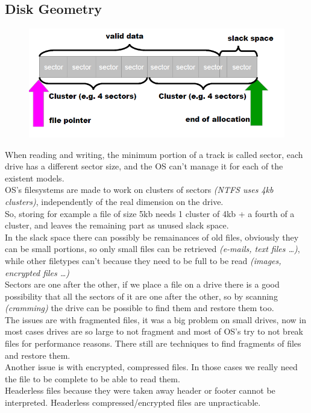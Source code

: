         \subsection{Disk Geometry}
            \begin{figure}[ht!]
                \centering
                \includegraphics[width=0.7\linewidth]{sectors.png}
            \end{figure}
            When reading and writing, the minimum portion of a track is called sector, each drive has a different sector size, and the OS can't manage it for each of the existent models.\\
            OS's filesystems are made to work on clusters of sectors \textit{(NTFS uses 4kb clusters)}, independently of the real dimension on the drive.\\ 
            So, storing for example a file of size 5kb needs 1 cluster of 4kb + a fourth of a cluster, and leaves the remaining part as unused slack space.\\
            In the slack space there can possibly be remainances of old files, obviously they can be small portions, so only small files can be retrieved \textit{(e-mails, text files \dots)}, while other filetypes can't because they need to be full to be read \textit{(images, encrypted files \dots)}\\
            Sectors are one after the other, if we place a file on a drive there is a good possibility that all the sectors of it are one after the other, so by scanning \textit{(cramming)} the drive can be possible to find them and restore them too.\\
            The issues are with fragmented files, it was a big problem on small drives, now in most cases drives are so large to not fragment and most of OS's try to not break files for performance reasons. There still are techniques to find fragments of files and restore them.\\
            Another issue is with encrypted, compressed files. In those cases we really need the file to be complete to be able to read them.\\
            Headerless files because they were taken away header or footer cannot be interpreted. Headerless compressed/encrypted files are unpracticable.
